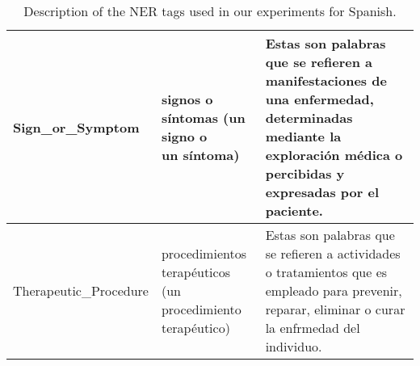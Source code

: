 \begin{table}[ht]
{\begin{tabular}{lll}
\midrule
Sign\_or\_Symptom & \makecell{signos o síntomas (un signo o \\un síntoma) } & \makecell{Estas son palabras que se refieren a manifestaciones de una enfermedad, determinadas mediante la exploración médica o \\percibidas y expresadas por el paciente. } \\
\midrule
Therapeutic\_Procedure & \makecell{procedimientos terapéuticos \\(un procedimiento terapéutico) } & \makecell{Estas son palabras que se refieren a actividades o tratamientos que es empleado para prevenir, reparar, eliminar o curar \\la enfrmedad del individuo. } \\
\midrule
\bottomrule
\end{tabular}}
\caption{Description of the NER tags used in our experiments for Spanish.}
\label{tab:ner_tags_es}
\end{table}
